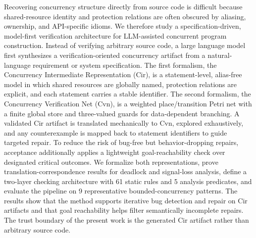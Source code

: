 Recovering concurrency structure directly from source code is difficult because shared-resource identity and protection relations are often obscured by aliasing, ownership, and API-specific idioms. We therefore study a specification-driven, model-first verification architecture for LLM-assisted concurrent program construction. Instead of verifying arbitrary source code, a large language model first synthesizes a verification-oriented concurrency artifact from a natural-language requirement or system specification. The first formalism, the Concurrency Intermediate Representation (Cir), is a statement-level, alias-free model in which shared resources are globally named, protection relations are explicit, and each statement carries a stable identifier. The second formalism, the Concurrency Verification Net (Cvn), is a weighted place/transition Petri net with a finite global store and three-valued guards for data-dependent branching. A validated Cir artifact is translated mechanically to Cvn, explored exhaustively, and any counterexample is mapped back to statement identifiers to guide targeted repair. To reduce the risk of bug-free but behavior-dropping repairs, acceptance additionally applies a lightweight goal-reachability check over designated critical outcomes. We formalize both representations, prove translation-correspondence results for deadlock and signal-loss analysis, define a two-layer checking architecture with 61 static rules and 5 analysis predicates, and evaluate the pipeline on 9 representative bounded-concurrency patterns. The results show that the method supports iterative bug detection and repair on Cir artifacts and that goal reachability helps filter semantically incomplete repairs. The trust boundary of the present work is the generated Cir artifact rather than arbitrary source code.